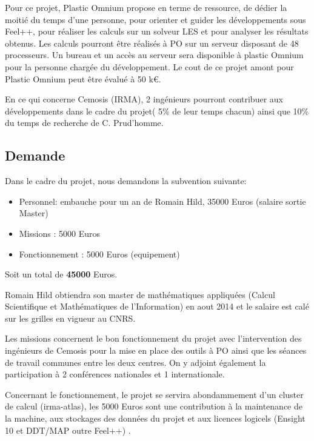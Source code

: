 \documentclass[12pt]{article}
\begin{document}
Pour ce projet, Plastic Omnium propose en terme de ressource, de dédier la
moitié du temps d’une personne, pour orienter et guider les développements sous
Feel++, pour réaliser les calculs sur un solveur LES et pour analyser les
résultats obtenus. Les calculs pourront être réalisés à PO sur un serveur
disposant de 48 processeurs. Un bureau et un accès au serveur sera disponible à
plastic Omnium pour la personne chargée du développement. Le cout de ce projet
amont pour Plastic Omnium peut être évalué à 50 k€.

En ce qui concerne Cemosis (IRMA), 2 ingénieurs pourront contribuer aux
développements dans le cadre du projet( 5\% de leur temps chacun) ainsi que 10\%
du temps de recherche de C. Prud'homme.

\subsection{Demande}


Dans le cadre du projet, nous demandons la subvention suivante:
\begin{itemize}
\item Personnel: embauche pour un an de Romain Hild, 35000 Euros (salaire sortie Master)
\item Missions : 5000 Euros
\item Fonctionnement  : 5000 Euros (equipement)
\end{itemize}
Soit un total de \textbf{45000} Euros.

Romain Hild obtiendra son master de mathématiques appliquées (Calcul
Scientifique et Mathématiques de l'Information) en aout 2014 et le salaire est
calé sur les grilles en vigueur au CNRS.

Les missions concernent le bon fonctionnement du projet avec l'intervention des
ingénieurs de Cemosis pour la mise en place des outils à PO ainsi que les
séances de travail communes entre les deux centres. On y adjoint également la
participation à 2 conférences nationales et 1 internationale.

Concernant le fonctionnement, le projet se servira abondammement d'un cluster de
calcul (irma-atlas), les 5000 Euros sont une contribution à la maintenance de la
machine, aux stockages des données du projet et aux licences logicels (Ensight
10 et DDT/MAP outre Feel++) .




\end{document}
